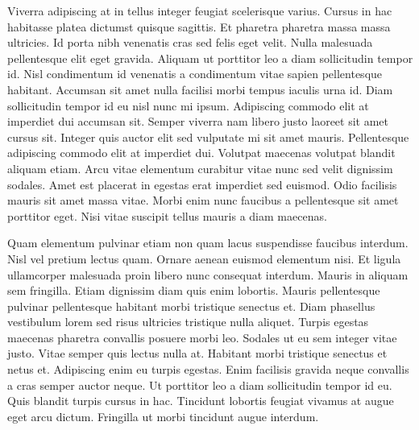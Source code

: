 \documentclass{article}
\begin{document}
Viverra adipiscing at in tellus integer feugiat scelerisque varius. Cursus in hac habitasse platea dictumst quisque sagittis. Et pharetra pharetra massa massa ultricies. Id porta nibh venenatis cras sed felis eget velit. Nulla malesuada pellentesque elit eget gravida. Aliquam ut porttitor leo a diam sollicitudin tempor id. Nisl condimentum id venenatis a condimentum vitae sapien pellentesque habitant. Accumsan sit amet nulla facilisi morbi tempus iaculis urna id. Diam sollicitudin tempor id eu nisl nunc mi ipsum. Adipiscing commodo elit at imperdiet dui accumsan sit. Semper viverra nam libero justo laoreet sit amet cursus sit. Integer quis auctor elit sed vulputate mi sit amet mauris. Pellentesque adipiscing commodo elit at imperdiet dui. Volutpat maecenas volutpat blandit aliquam etiam. Arcu vitae elementum curabitur vitae nunc sed velit dignissim sodales. Amet est placerat in egestas erat imperdiet sed euismod. Odio facilisis mauris sit amet massa vitae. Morbi enim nunc faucibus a pellentesque sit amet porttitor eget. Nisi vitae suscipit tellus mauris a diam maecenas.

Quam elementum pulvinar etiam non quam lacus suspendisse faucibus interdum. Nisl vel pretium lectus quam. Ornare aenean euismod elementum nisi. Et ligula ullamcorper malesuada proin libero nunc consequat interdum. Mauris in aliquam sem fringilla. Etiam dignissim diam quis enim lobortis. Mauris pellentesque pulvinar pellentesque habitant morbi tristique senectus et. Diam phasellus vestibulum lorem sed risus ultricies tristique nulla aliquet. Turpis egestas maecenas pharetra convallis posuere morbi leo. Sodales ut eu sem integer vitae justo. Vitae semper quis lectus nulla at. Habitant morbi tristique senectus et netus et. Adipiscing enim eu turpis egestas. Enim facilisis gravida neque convallis a cras semper auctor neque. Ut porttitor leo a diam sollicitudin tempor id eu. Quis blandit turpis cursus in hac. Tincidunt lobortis feugiat vivamus at augue eget arcu dictum. Fringilla ut morbi tincidunt augue interdum.
\end{document}
